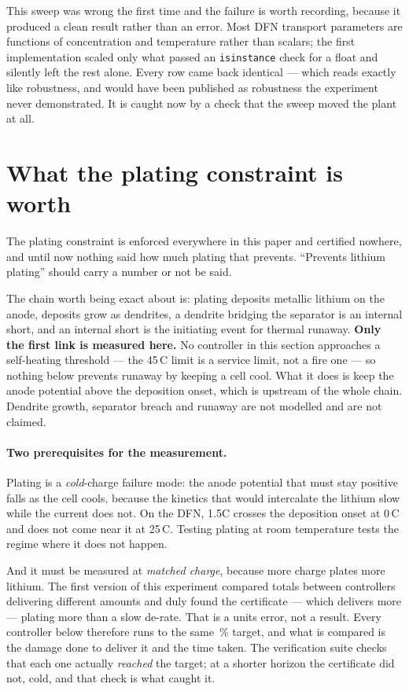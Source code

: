 \documentclass[11pt,letterpaper]{article}
\theoremstyle{definition}
\theoremstyle{remark}
\newcommand{\SI}[2]{#1\,#2}
\newcommand{\degreeCelsius}{\degC}
\newcommand{\degC}{\ifmmode{^\circ}\mathrm{C}\else\textdegree C\fi}
\begin{document}
This sweep was wrong the first time and the failure is worth recording, because it produced a
clean result rather than an error. Most DFN transport parameters are functions of concentration
and temperature rather than scalars; the first implementation scaled only what passed an
\texttt{isinstance} check for a float and silently left the rest alone. Every row came back
identical --- which reads exactly like robustness, and would have been published as robustness the
experiment never demonstrated. It is caught now by a check that the sweep moved the plant at all.


\section{What the plating constraint is worth}\label{sec:plating}

The plating constraint is enforced everywhere in this paper and certified nowhere, and until now
nothing said how much plating that prevents. ``Prevents lithium plating'' should carry a number
or not be said.

The chain worth being exact about is: plating deposits metallic lithium on the anode, deposits
grow as dendrites, a dendrite bridging the separator is an internal short, and an internal short
is the initiating event for thermal runaway. \textbf{Only the first link is measured here.} No
controller in this section approaches a self-heating threshold --- the \SI{45}{\degreeCelsius} limit is a
service limit, not a fire one --- so nothing below prevents runaway by keeping a cell cool.
What it does is keep the anode potential above the deposition onset, which is upstream of the
whole chain. Dendrite growth, separator breach and runaway are not modelled and are not claimed.

\paragraph{Two prerequisites for the measurement.} Plating is a \emph{cold}-charge failure mode:
the anode potential that must stay positive falls as the cell cools, because the kinetics that
would intercalate the lithium slow while the current does not. On the DFN, 1.5C crosses the
deposition onset at \SI{0}{\degreeCelsius} and does not come near it at \SI{25}{\degreeCelsius}. Testing plating at room
temperature tests the regime where it does not happen.

And it must be measured at \emph{matched charge}, because more charge plates more lithium. The
first version of this experiment compared totals between controllers delivering different
amounts and duly found the certificate --- which delivers more --- plating more than a slow
de-rate. That is a units error, not a result. Every controller below therefore runs to the same
\plTarget\,\% target, and what is compared is the damage done to deliver it and the time taken.
The verification suite checks that each one actually \emph{reached} the target; at a shorter
horizon the certificate did not, cold, and that check is what caught it.
\end{document}
